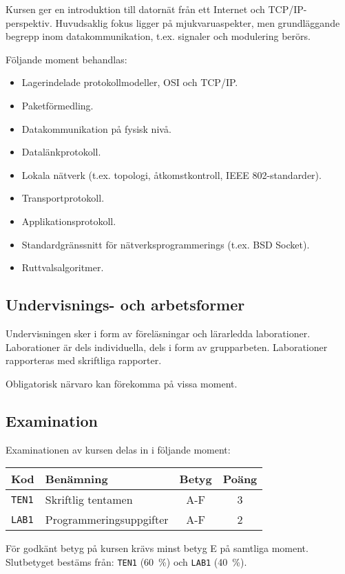 Kursen ger en introduktion till datornät från ett Internet och
TCP/IP-perspektiv. Huvudsaklig fokus ligger på mjukvaruaspekter, men
grundläggande begrepp inom datakommunikation, t.ex. signaler och
modulering berörs.

Följande moment behandlas:

\begin{itemize}
\tightlist
\item
  Lagerindelade protokollmodeller, OSI och TCP/IP.
\item
  Paketförmedling.
\item
  Datakommunikation på fysisk nivå.
\item
  Datalänkprotokoll.
\item
  Lokala nätverk (t.ex. topologi, åtkomstkontroll, IEEE 802-standarder).
\item
  Transportprotokoll.
\item
  Applikationsprotokoll.
\item
  Standardgränssnitt för nätverksprogrammerings (t.ex. BSD Socket).
\item
  Ruttvalsalgoritmer.
\end{itemize}

\subsection*{Undervisnings- och
arbetsformer}

Undervisningen sker i form av föreläsningar och lärarledda laborationer.
Laborationer är dels individuella, dels i form av grupparbeten.
Laborationer rapporteras med skriftliga rapporter.

Obligatorisk närvaro kan förekomma på vissa moment.

\subsection*{Examination}

Examinationen av kursen delas in i följande moment:

\begin{longtable}[]{@{}llcc@{}}
\toprule
\textsf{Kod} & \textsf{Benämning} & \textsf{Betyg} & \textsf{Poäng}\tabularnewline
\midrule
\endhead
\texttt{TEN1} & Skriftlig tentamen & A-F & 3\tabularnewline
\texttt{LAB1} & Programmeringsuppgifter & A-F & 2\tabularnewline
\bottomrule
\end{longtable}

För godkänt betyg på kursen krävs minst betyg E på samtliga moment.
Slutbetyget bestäms från: \texttt{TEN1} (60~\%) och \texttt{LAB1} (40~\%).

